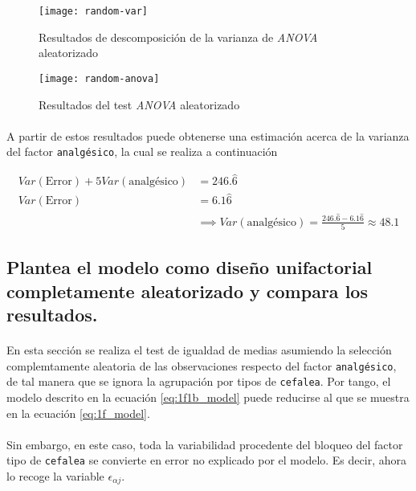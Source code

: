 \documentclass[11pt]{article}
\begin{document}
      \begin{figure}[H]
        \centering
        \texttt{[image: random-var]}
        \caption{Resultados de descomposición de la varianza de \emph{ANOVA} aleatorizado}
        \label{fig:random-anova-results-1}
      \end{figure}

      \begin{figure}[H]
        \centering
        \texttt{[image: random-anova]}
        \caption{Resultados del test \emph{ANOVA} aleatorizado}
        \label{fig:random-anova-results-2}
      \end{figure}

      \paragraph{}
      A partir de estos resultados puede obtenerse una estimación acerca de la varianza del factor \texttt{analgésico}, la cual se realiza a continuación

      \begin{align*}
        Var(\text{Error}) + 5 Var(\text{analgésico}) &= 246.\widehat{6} \\
        Var(\text{Error}) &= 6.1\widehat{6} \\
        &\implies Var(\text{analgésico}) = \frac{246.\widehat{6} - 6.1\widehat{6}}{5} \approx 48.1
      \end{align*}

    \subsection{Plantea el modelo como diseño unifactorial completamente aleatorizado y compara los resultados.}

      \paragraph{}
      En esta sección se realiza el test de igualdad de medias asumiendo la selección complemtamente aleatoria de las observaciones respecto del factor \texttt{analgésico}, de tal manera que se ignora la agrupación por tipos de \texttt{cefalea}. Por tango, el modelo descrito en la ecuación \eqref{eq:1f1b_model} puede reducirse al que se muestra en la ecuación \eqref{eq:1f_model}.

      \paragraph{}
      Sin embargo, en este caso, toda la variabilidad procedente del bloqueo del factor tipo de \texttt{cefalea} se convierte en error no explicado por el modelo. Es decir, ahora lo recoge la variable $\epsilon_{\alpha j}$.
\end{document}
